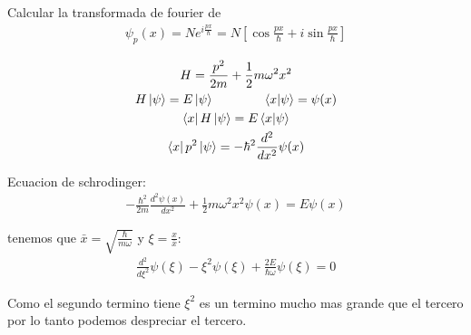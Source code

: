 \documentclass{article}
\newcommand{\caja}[3]{%
  \begin{tcolorbox}[colback=#1!5!white,colframe=#1!25!black,title=#2]
    #3
  \end{tcolorbox}%
}
\begin{document}
\caja{black}{Tarea }{
  Calcular la transformada de fourier de 
  \begin{gather*}
    \psi_p(x) = N e ^ {i \frac{p x }{\hbar }} = N\left[\cos{\frac{px }{\hbar }} + i \sin{\frac{px }{\hbar }}\right] 
  \end{gather*}
}

\hfill 

\hfill 

\begin{gather*}
  H = \frac{p ^2}{2 m } + \frac{1}{2} m \omega ^2 x ^2\\
  H \ket{\psi } = E \ket{\psi } \qquad \qquad \bra{x}\ket{\psi } = \psi(x) \\
  \bra{x }H \ket{\psi } = E \bra{x }\ket{\psi} \\
  \bra{x }p ^2\ket{\psi} = - \hbar ^2 \frac{d ^2  }{d x^2}\psi(x) 
\end{gather*}

Ecuacion de schrodinger: 
\begin{gather*}
  - \frac{\hbar  ^2}{2m }\frac{d ^2\psi(x)  }{d x ^2} + \frac{1}{2}m \omega ^2 x ^2 \psi(x) = E \psi(x) 
\end{gather*}

tenemos que $ \bar x  = \sqrt{\frac{\hbar }{m \omega}}  $ y $ \xi = \frac{x }{\bar x } $:
\begin{gather*}
  \frac{d ^2  }{d \xi ^2} \psi(\xi) - \xi^2 \psi(\xi ) + \frac{2E }{\hbar \omega} \psi(\xi) = 0 
\end{gather*}

Como el segundo termino tiene $ \xi^2  $ es un termino mucho mas grande que el tercero por lo tanto podemos despreciar el tercero.
\end{document}

